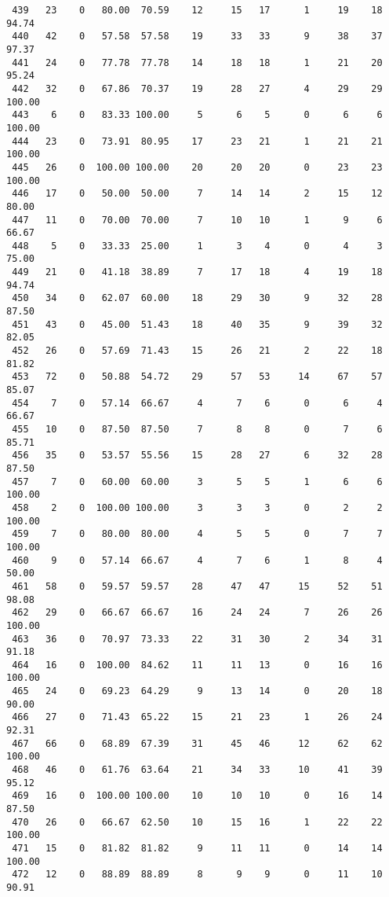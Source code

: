 \begin{verbatim}
 439   23    0   80.00  70.59    12     15   17      1     19    18    94.74
 440   42    0   57.58  57.58    19     33   33      9     38    37    97.37
 441   24    0   77.78  77.78    14     18   18      1     21    20    95.24
 442   32    0   67.86  70.37    19     28   27      4     29    29   100.00
 443    6    0   83.33 100.00     5      6    5      0      6     6   100.00
 444   23    0   73.91  80.95    17     23   21      1     21    21   100.00
 445   26    0  100.00 100.00    20     20   20      0     23    23   100.00
 446   17    0   50.00  50.00     7     14   14      2     15    12    80.00
 447   11    0   70.00  70.00     7     10   10      1      9     6    66.67
 448    5    0   33.33  25.00     1      3    4      0      4     3    75.00
 449   21    0   41.18  38.89     7     17   18      4     19    18    94.74
 450   34    0   62.07  60.00    18     29   30      9     32    28    87.50
 451   43    0   45.00  51.43    18     40   35      9     39    32    82.05
 452   26    0   57.69  71.43    15     26   21      2     22    18    81.82
 453   72    0   50.88  54.72    29     57   53     14     67    57    85.07
 454    7    0   57.14  66.67     4      7    6      0      6     4    66.67
 455   10    0   87.50  87.50     7      8    8      0      7     6    85.71
 456   35    0   53.57  55.56    15     28   27      6     32    28    87.50
 457    7    0   60.00  60.00     3      5    5      1      6     6   100.00
 458    2    0  100.00 100.00     3      3    3      0      2     2   100.00
 459    7    0   80.00  80.00     4      5    5      0      7     7   100.00
 460    9    0   57.14  66.67     4      7    6      1      8     4    50.00
 461   58    0   59.57  59.57    28     47   47     15     52    51    98.08
 462   29    0   66.67  66.67    16     24   24      7     26    26   100.00
 463   36    0   70.97  73.33    22     31   30      2     34    31    91.18
 464   16    0  100.00  84.62    11     11   13      0     16    16   100.00
 465   24    0   69.23  64.29     9     13   14      0     20    18    90.00
 466   27    0   71.43  65.22    15     21   23      1     26    24    92.31
 467   66    0   68.89  67.39    31     45   46     12     62    62   100.00
 468   46    0   61.76  63.64    21     34   33     10     41    39    95.12
 469   16    0  100.00 100.00    10     10   10      0     16    14    87.50
 470   26    0   66.67  62.50    10     15   16      1     22    22   100.00
 471   15    0   81.82  81.82     9     11   11      0     14    14   100.00
 472   12    0   88.89  88.89     8      9    9      0     11    10    90.91

\end{verbatim}
